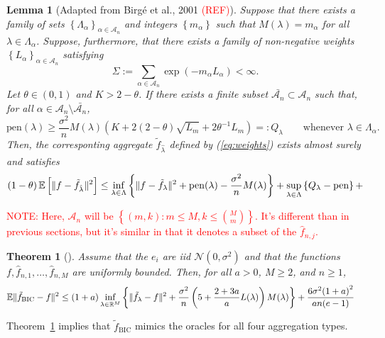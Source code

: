 \documentclass[12pt, letter paper]{article}
\newcommand{\1}{\mathmybb{1}}
\newtheorem{theorem}[proposition]{Theorem}
\newtheorem{lemma}[proposition]{Lemma}
\newcommand{\R}{\mathbb{R}}
\newcommand{\0}{\emptyset}
\newcommand{\E}{\mathbb{E}}
\newcommand{\Ep}[1]{\mathbb{E}\left[ #1 \right]}
\newcommand{\paren}[1]{\left(#1 \right)}
\newcommand{\set}[1]{\left\{ #1 \right\}}
\newcommand{\norm}[1]{|\hspace{-1pt}|#1 |\hspace{-1pt}|}
\newcommand{\normsq}[1]{\norm{#1}^{2}}
\newcommand{\Acal}{\mathcal{A}_{n}}
\newcommand{\Ncal}{\mathcal{N}}
\newcommand{\fhat}[2]{\hat{f}_{#1, #2}}
\newcommand{\ftilde}[1]{\tilde{f}_{#1}}
\newcommand{\lambdahat}[1]{\hat{\lambda}_{#1}}
\begin{document}
\begin{lemma}[Adapted from Birgé et al., 2001 \textcolor{red}{(REF)}]\label{lemm:birge}
    Suppose that there exists a family of sets \(\set{\Lambda_{\alpha}}_{\alpha\in\Acal}\) and integers \(\set{m_{\alpha}}\) such that \(M(\lambda) = m_{\alpha}\) for all \(\lambda\in\Lambda_{\alpha}\). Suppose, furthermore, that there exists a family of non-negative weights \(\set{L_{\alpha}}_{\alpha\in\Acal}\) satisfying 
    \[\Sigma:=\sum_{\alpha\in\Acal}\exp\paren{-m_{\alpha}L_{\alpha}}<\infty.\]
    Let \(\theta\in(0,1)\) and \(K>2-\theta\). If there exists a finite subset \(\bar{\Acal}\subset\Acal\) such that, for all \(\alpha\in\Acal\setminus\bar{\Acal}\), 
    \[\mathrm{pen}(\lambda)\geq \frac{\sigma^2}{n}M(\lambda)\paren{K + 2(2-\theta)\sqrt{L_{m}} +2{\theta^{-1}}L_{m}} =: Q_{\lambda}\qquad\text{whenever }\lambda\in\Lambda_{\alpha}.\]
    Then, the corresponting aggregate \(\ftilde{\lambdahat{}}\) defined by (\ref{eq:weights}) exists almost surely and satisfies
    \begin{equation}
        \paren{1-\theta}\Ep{\normsq{f - \ftilde{\lambdahat{}}}} \leq \inf_{\lambda\in\Lambda}\set{\normsq{f - \ftilde{\lambda}} + \mathrm{pen}(\lambda) - \frac{\sigma^2}{n}M(\lambda)} + \sup_{\lambda\in\Lambda}\set{Q_{\lambda} - \mathrm{pen}} + 
    \end{equation}

\end{lemma}
\textcolor{red}{NOTE: Here, \(\Acal\) will be \(\set{(m,k):m\leq M, k\leq \binom{M}{m}}\). It's different than in previous sections, but it's similar in that it denotes a subset of the \(\fhat{n}{j}\).}

\begin{theorem}[\cite{bunea_2007}]\label{prop:buneath31}
    Assume that the \(e_{i}\) are iid \(\Ncal(0, \sigma^{2})\) and that the functions \(f, \fhat{n}{1}, \ldots, \fhat{n}{M}\) are uniformly bounded. Then, for all \(a>0\), \(M\geq 2\), and \(n\geq 1\),
    \begin{align*}
        \E\normsq{\ftilde{\mathrm{BIC}} - f} &\leq (1+a)\inf_{\lambda\in\R^{M}}\set{\normsq{\ftilde{\lambda} - f} + \frac{\sigma^{2}}{n}\paren{5+\frac{2+3a}{a}{L(\lambda)}}M(\lambda)} + \frac{6\sigma^{2}{(1+a)}^{2}}{an(e-1)}
    \end{align*}

\end{theorem}

Theorem~\ref{prop:buneath31} implies that \(\ftilde{\mathrm{BIC}}\) mimics the oracles for all four aggregation types.

\newpage
\printbibliography{}
\end{document}
